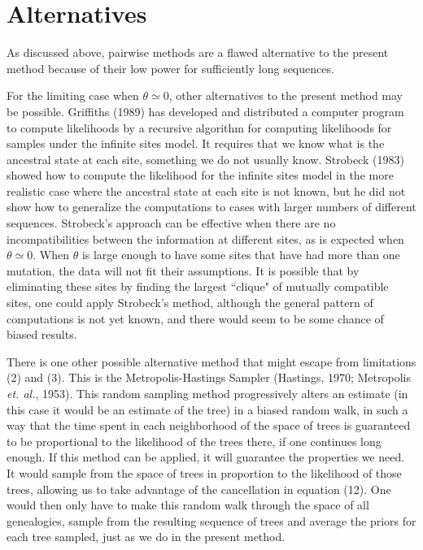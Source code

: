 \section{Alternatives}

As discussed above, pairwise methods are a flawed alternative to the
present method because of their low power for sufficiently long
sequences.

For the limiting case when $\theta \simeq 0$, other alternatives to the present
method may be possible.  Griffiths (1989) has developed and distributed a
computer program to compute likelihoods by a recursive algorithm for computing
likelihoods for samples under the infinite sites model.  It requires that we
know what is the ancestral state at each site, something we do not usually know.
Strobeck (1983) showed how to compute the likelihood for the infinite
sites model in the more realistic case where the ancestral state at
each site is not known, but he did not show how to generalize the
computations to cases with larger numbers of different sequences.
Strobeck's approach can be effective when there are no incompatibilities
between the information at different sites, as is
expected when $\theta \simeq 0$.  When $\theta$ is large enough to have
some sites that have had more than one mutation, the data will not fit
their assumptions.  It is possible that by eliminating these sites by
finding the largest ``clique" of mutually compatible sites, one could apply
Strobeck's method, although the general pattern of computations is not yet
known, and there would seem to be some chance of biased results.

There is one other possible alternative method that might escape from
limitations (2) and (3).  This is the Metropolis-Hastings Sampler (Hastings, 1970; Metropolis {\it et. al.}, 1953).  This random sampling method progressively alters an estimate (in
this case it would be an estimate of the tree) in a biased random walk,
in such a way that the time spent in each neighborhood of the space of trees is
guaranteed to be proportional to the likelihood of the trees there, if
one continues long enough.  If this method can be applied, it will
guarantee the properties we need.  It would sample from the space of trees
in proportion to the likelihood of those trees, allowing us to take advantage
of the cancellation in equation (12).  One would then only have to make this
random walk through the space of all genealogies, sample from the
resulting sequence of trees and average the priors for each tree sampled, just
as we do in the present method.

